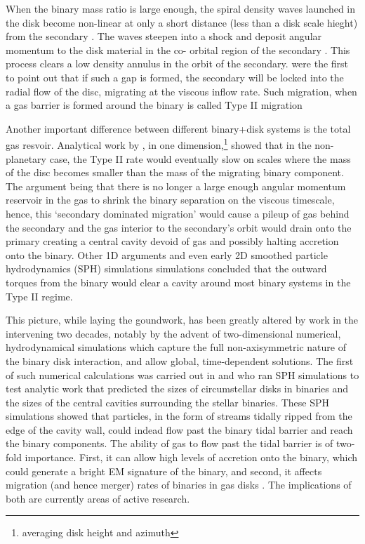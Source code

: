 When the binary mass ratio is large enough, the spiral density waves launched
in the disk become non-linear at only a short distance (less than a disk scale
hieght) from the secondary \citep{GoodmanRafikov:2001}. The waves steepen into
a shock and deposit angular momentum to the disk material in the co- orbital
region of the secondary \citep{DongRafI:2011, DongRafII:2011, LinPapa, chapter3}. This
process clears a low density annulus in the orbit of the secondary.
\cite{LinPapa:1986b} were the first to point out that if such a gap is formed,
the secondary will be locked into the radial flow of the disc, migrating at
the viscous inflow rate. Such migration, when a gas barrier is formed around
the binary is called Type II migration \citep[see also][and Chapter 3]{Ward:1997, KleyNelson:2013, othertypeIIrefs}



Another important difference between different binary+disk systems is the
total gas resvoir. Analytical work by \citep{SyerClarke:95, Ivanov:1999}, in
one dimension,\footnote{averaging disk height and azimuth} showed that in the
non- planetary case, the Type II rate would eventually slow on scales where
the mass of the disc becomes smaller than the mass of the migrating binary
component. The argument being that there is no longer a large enough angular
momentum reservoir in the gas to shrink the binary separation on the viscous
timescale, hence, this `secondary dominated migration' would cause a pileup of
gas behind the secondary and the gas interior to the secondary's orbit would
drain onto the primary creating a central cavity devoid of gas and possibly
halting accretion onto the binary. Other 1D arguments \citep{other1Darguments} and even early 2D smoothed particle hydrodynamics (SPH)
simulations simulations \citep{Artymowicz:1991} concluded that the outward
torques from the binary would clear a cavity around most binary systems in the
Type II regime.


This picture, while laying the goundwork, has been greatly altered by work in
the intervening two decades, notably by the advent of two-dimensional
numerical, hydrodynamical simulations which capture the full non-axisymmetric
nature of the binary disk interaction, and allow global, time-dependent
solutions. The first of such numerical calculations was carried out in
\cite{AL94} and \cite{ArtyLubow:1996} who ran SPH simulations to
test analytic work that predicted the sizes of circumstellar disks in binaries
and the sizes of the central cavities surrounding the stellar binaries. These
SPH simulations showed that particles, in the form of streams tidally ripped
from the edge of the cavity wall, could indead flow past the binary tidal
barrier and reach the binary components. The ability of gas to flow past the
tidal barrier is of two-fold importance. First, it can allow high levels of
accretion onto the binary, which could generate a bright EM signature of the
binary, and second, it affects migration (and hence merger) rates of binaries
in gas disks \citep{DuffellFTV:2014}. The implications of both are currently areas
of active research. 




